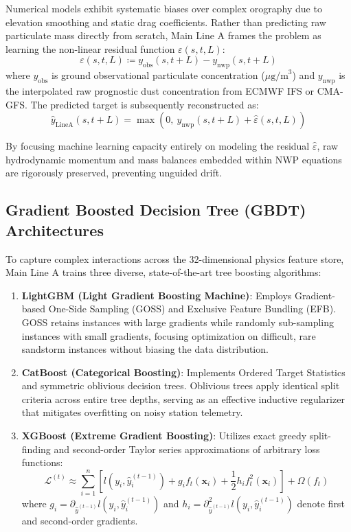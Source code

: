 Numerical models exhibit systematic biases over complex orography due to elevation smoothing and static drag coefficients. Rather than predicting raw particulate mass directly from scratch, Main Line A frames the problem as learning the non-linear residual function $\varepsilon(s, t, L)$:
\begin{equation}
\label{eq:residual_target}
\varepsilon(s, t, L) \coloneqq y_{\text{obs}}(s, t+L) - y_{\text{nwp}}(s, t+L)
\end{equation}
where $y_{\text{obs}}$ is ground observational particulate concentration ($\mu\text{g/m}^3$) and $y_{\text{nwp}}$ is the interpolated raw prognostic dust concentration from ECMWF IFS or CMA-GFS. The predicted target is subsequently reconstructed as:
\begin{equation}
\label{eq:residual_reconstruction}
\hat{y}_{\text{LineA}}(s, t+L) = \max\left(0, \ y_{\text{nwp}}(s, t+L) + \hat{\varepsilon}(s, t, L)\right)
\end{equation}

By focusing machine learning capacity entirely on modeling the residual $\hat{\varepsilon}$, raw hydrodynamic momentum and mass balances embedded within NWP equations are rigorously preserved, preventing unguided drift.

\subsection{Gradient Boosted Decision Tree (GBDT) Architectures}
\label{subsec:gbdt_models}

To capture complex interactions across the 32-dimensional physics feature store, Main Line A trains three diverse, state-of-the-art tree boosting algorithms:
\begin{enumerate}
    \item \textbf{LightGBM (Light Gradient Boosting Machine)}: Employs Gradient-based One-Side Sampling (GOSS) and Exclusive Feature Bundling (EFB). GOSS retains instances with large gradients while randomly sub-sampling instances with small gradients, focusing optimization on difficult, rare sandstorm instances without biasing the data distribution.
    \item \textbf{CatBoost (Categorical Boosting)}: Implements Ordered Target Statistics and symmetric oblivious decision trees. Oblivious trees apply identical split criteria across entire tree depths, serving as an effective inductive regularizer that mitigates overfitting on noisy station telemetry.
    \item \textbf{XGBoost (Extreme Gradient Boosting)}: Utilizes exact greedy split-finding and second-order Taylor series approximations of arbitrary loss functions:
    \begin{equation}
    \label{eq:xgboost_obj}
    \mathcal{L}^{(t)} \approx \sum_{i=1}^n \left[ l(y_i, \hat{y}^{(t-1)}_i) + g_i f_t(\mathbf{x}_i) + \frac{1}{2} h_i f_t^2(\mathbf{x}_i) \right] + \Omega(f_t)
    \end{equation}
    where $g_i = \partial_{\hat{y}^{(t-1)}} l(y_i, \hat{y}^{(t-1)}_i)$ and $h_i = \partial^2_{\hat{y}^{(t-1)}} l(y_i, \hat{y}^{(t-1)}_i)$ denote first and second-order gradients.
\end{enumerate}

